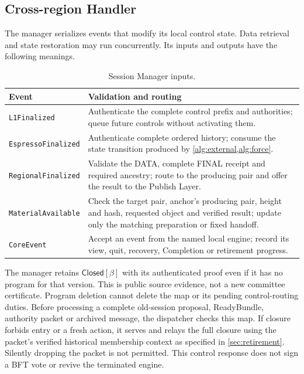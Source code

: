 \documentclass[11pt,a4paper]{article}
\newcommand{\tagg}[1]{\ensuremath{\mathsf{#1}}}
\begin{document}
\subsection{Cross-region Handler}
\label{sec:session-manager}
The manager serializes events that modify its local control state.
Data retrieval and state restoration may run concurrently. Its
inputs and outputs have the following meanings.

\begin{table}[htbp]\centering\small
\caption{Session Manager inputs.}
\label{tab:manager-inputs}
\begin{tabularx}{\linewidth}{@{}>{\raggedright\arraybackslash}p{.24\linewidth}Y@{}}\toprule
Event & Validation and routing\\\midrule
\texttt{L1Finalized} & Authenticate the complete control prefix and
authorities; queue future controls without activating them.\\
\texttt{EspressoFinalized} & Authenticate complete ordered history;
consume the state transition produced by \cref{alg:external,alg:force}.\\
\texttt{RegionalFinalized} & Validate the DATA, complete FINAL receipt
and required ancestry; route to the producing pair and offer the result
to the Publish Layer.\\
\texttt{MaterialAvailable} & Check the target pair, anchor's producing
pair, height and hash, requested object and verified result; update only
the matching preparation or fixed handoff.\\
\texttt{CoreEvent} & Accept an event from the named local engine;
record its view, quit, recovery, Completion or retirement progress.\\\bottomrule
\end{tabularx}
\end{table}

The manager retains $\tagg{Closed}[\beta]$ with its authenticated proof
even if it has no program for that version. This is public source evidence,
not a new committee certificate. Program deletion cannot delete the map
or its pending control-routing duties. Before processing a complete
old-session proposal, ReadyBundle, authority packet or archived message,
the dispatcher checks this map. If closure forbids entry or a fresh
action, it serves and relays the full closure using the packet's verified
historical membership context as specified in \cref{sec:retirement}.
Silently dropping the packet is not permitted. This control response
does not sign a BFT vote or revive the terminated engine.
\end{document}
